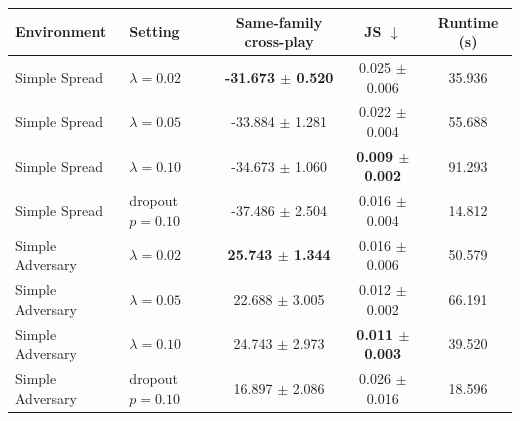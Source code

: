 \begin{tabular}{llccc}
\toprule
Environment & Setting & Same-family cross-play & JS $\downarrow$ & Runtime (s) \\
\midrule
Simple Spread & $\lambda=0.02$ & \textbf{-31.673 $\pm$ 0.520} & 0.025 $\pm$ 0.006 & 35.936 \\
Simple Spread & $\lambda=0.05$ & -33.884 $\pm$ 1.281 & 0.022 $\pm$ 0.004 & 55.688 \\
Simple Spread & $\lambda=0.10$ & -34.673 $\pm$ 1.060 & \textbf{0.009 $\pm$ 0.002} & 91.293 \\
Simple Spread & dropout $p=0.10$ & -37.486 $\pm$ 2.504 & 0.016 $\pm$ 0.004 & 14.812 \\
\midrule
Simple Adversary & $\lambda=0.02$ & \textbf{25.743 $\pm$ 1.344} & 0.016 $\pm$ 0.006 & 50.579 \\
Simple Adversary & $\lambda=0.05$ & 22.688 $\pm$ 3.005 & 0.012 $\pm$ 0.002 & 66.191 \\
Simple Adversary & $\lambda=0.10$ & 24.743 $\pm$ 2.973 & \textbf{0.011 $\pm$ 0.003} & 39.520 \\
Simple Adversary & dropout $p=0.10$ & 16.897 $\pm$ 2.086 & 0.026 $\pm$ 0.016 & 18.596 \\
\bottomrule
\end{tabular}
